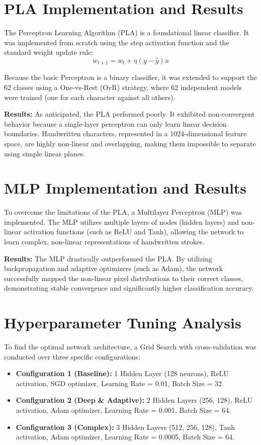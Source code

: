 \documentclass[11pt]{article}
\begin{document}
\section*{PLA Implementation and Results}

The Perceptron Learning Algorithm (PLA) is a foundational linear classifier. It was implemented from scratch using the step activation function and the standard weight update rule:
\[
w_{t+1} = w_{t} + \eta (y - \hat{y})x
\]

Because the basic Perceptron is a binary classifier, it was extended to support the 62 classes using a One-vs-Rest (OvR) strategy, where 62 independent models were trained (one for each character against all others).

\textbf{Results:} As anticipated, the PLA performed poorly. It exhibited non-convergent behavior because a single-layer perceptron can only learn linear decision boundaries. Handwritten characters, represented in a 1024-dimensional feature space, are highly non-linear and overlapping, making them impossible to separate using simple linear planes.
\section*{MLP Implementation and Results}

To overcome the limitations of the PLA, a Multilayer Perceptron (MLP) was implemented. The MLP utilizes multiple layers of nodes (hidden layers) and non-linear activation functions (such as ReLU and Tanh), allowing the network to learn complex, non-linear representations of handwritten strokes.

\textbf{Results:} The MLP drastically outperformed the PLA. By utilizing backpropagation and adaptive optimizers (such as Adam), the network successfully mapped the non-linear pixel distributions to their correct classes, demonstrating stable convergence and significantly higher classification accuracy.
\section*{Hyperparameter Tuning Analysis}

To find the optimal network architecture, a Grid Search with cross-validation was conducted over three specific configurations:

\begin{itemize}
    \item \textbf{Configuration 1 (Baseline):} 1 Hidden Layer (128 neurons), ReLU activation, SGD optimizer, Learning Rate = 0.01, Batch Size = 32.
    
    \item \textbf{Configuration 2 (Deep \& Adaptive):} 2 Hidden Layers (256, 128), ReLU activation, Adam optimizer, Learning Rate = 0.001, Batch Size = 64.
    
    \item \textbf{Configuration 3 (Complex):} 3 Hidden Layers (512, 256, 128), Tanh activation, Adam optimizer, Learning Rate = 0.0005, Batch Size = 64.
\end{itemize}
\end{document}
